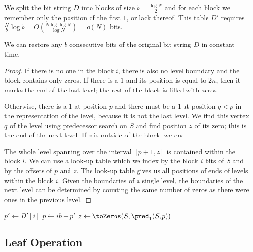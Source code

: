 We split the bit string $D$ into blocks of size $b = \frac{\log N}{2}$ and for each block we remember only the position of the first $1$, or lack thereof.
This table $D'$ requires $\frac{N}{b} \log b = O(\frac{N \log\log N}{\log N}) = o(N)$ bits.

\begin{lemma}
	We can restore any $b$ consecutive bits of the original bit string $D$ in constant time.
\end{lemma}
\begin{proof}
	If there is no one in the block $i$, there is also no level boundary and the block contains only zeros.
	If there is a $1$ and its position is equal to $2n$, then it marks the end of the last level; the rest of the block is filled with zeros.

	Otherwise, there is a $1$ at position $p$ and there must be a $1$ at position $q < p$ in the representation of the level, because it is not the last level.
	We find this vertex $q$ of the level using predecessor search on $S$ and find position $z$ of its zero; this is the end of the next level.
	If $z$ is outside of the block, we end.
	
	The whole level spanning over the interval $[p + 1, z]$ is contained within the block $i$.
	We can use a look-up table \blockOfD{} which we index by the block $i$ bits of $S$ and by the offsets of $p$ and $z$.
	The look-up table gives us all positions of ends of levels within the block $i$.
	Given the boundaries of a single level, the boundaries of the next level can be determined by counting the same number of zeros as there were ones in the previous level.
\end{proof}

\begin{algorithmic}
 
	\State $p' \gets D'[i]$
	 
		\State {}
	\Else
		\State $p \gets i b + p'$
		 
			\State {} 
		\Else
			\State $z \gets \toZeros(S, \pred_1(S, p))$
			 
				\State {}
			\Else
				\State \Return{$\blockOfD[S[i b : (i + 1) b], p', z \% b]$}
			\EndIf
		\EndIf
	\EndIf
\EndFunction
\end{algorithmic}

\subsection{\label{ss:leaf-queries}Leaf Operation}

